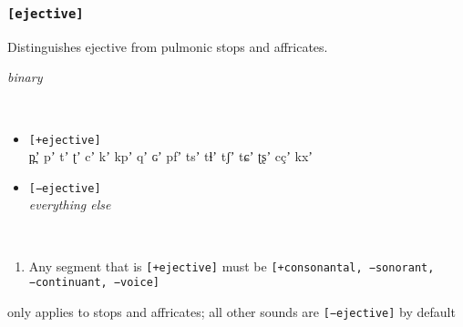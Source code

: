 \documentclass[10pt,letterpaper]{article}
\begin{document}
\subsubsection{\texttt{[ejective]}}
\label{ssub:feature_ejective}
\begin{samepage}
\begin{description}
\itemsep1pt \parskip0pt  
\item[Descritpion] Distinguishes ejective from pulmonic stops and affricates.
\item[Type] \emph{binary}
\item[Examples]\
  \begin{itemize}
    \item \texttt{[+ejective]}\\
    p̪ʼ pʼ tʼ ʈʼ cʼ kʼ kpʼ qʼ ɢʼ pfʼ tsʼ tɬʼ tʃʼ tɕʼ ʈʂʼ cçʼ kxʼ
    \item \texttt{[−ejective]}\\
    \emph{everything else}
  \end{itemize}
\item[Constraints]\
  \begin{enumerate}
    \item Any segment that is \texttt{[+ejective]} must be \texttt{[+consonantal, −sonorant, −continuant, −voice]}
  \end{enumerate}
  \item[Resctrictions] only applies to stops and affricates; all other sounds are \texttt{[−ejective]} by default
\end{description}
\end{samepage}
\end{document}
